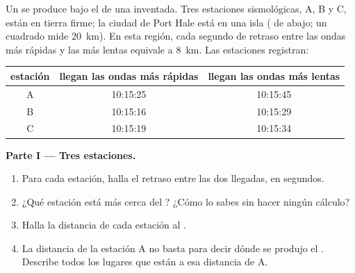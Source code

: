 \begin{problem}
\label{pb:g7:earthquakes:1}
Un  se produce bajo el  de una  inventada. Tres
estaciones sismológicas, A, B y C, están en tierra firme; la ciudad de
Port Hale está en una isla ( de abajo; un cuadrado mide \qty{20}{km}).
En esta región, cada segundo de retraso entre las ondas más rápidas y las
más lentas equivale a \qty{8}{km}. Las estaciones registran:

\begin{center}
\small
\begin{tabular}{|c|c|c|}
\hline
\textbf{estación} & \textbf{llegan las ondas más rápidas} & \textbf{llegan las ondas más lentas} \\
\hline
A & 10:15:25 & 10:15:45 \\
B & 10:15:16 & 10:15:29 \\
C & 10:15:19 & 10:15:34 \\
\hline
\end{tabular}
\end{center}

\medskip
\noindent\textbf{Parte I --- Tres estaciones.}\par\nopagebreak
\begin{enumerate}[beginpenalty=10000]
  \item Para cada estación, halla el retraso entre las dos llegadas, en
        segundos.
  \item ¿Qué estación está más cerca del ? ¿Cómo lo sabes sin
        hacer ningún cálculo?
  \item Halla la distancia de cada estación al .
  \item La distancia de la estación A no basta para decir dónde se produjo
        el . Describe todos los lugares que están a esa distancia
        de A.
\end{enumerate}


\end{problem}
